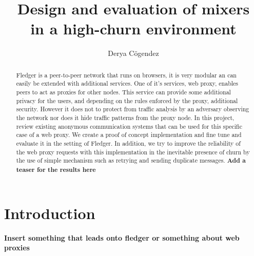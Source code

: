 \documentclass[a4paper,11pt,oneside]{report}
\title{Design and evaluation of mixers\\in a high-churn environment}
\author{Derya Cögendez}
\begin{document}
\maketitle
\makeacks

\begin{abstract}
Fledger is a peer-to-peer network that runs on browsers, it is very modular an can easily be extended with additional services. One of it's services, web proxy, enables peers to act as proxies for other nodes. This service can provide some additional privacy for the users, and depending on the rules enforced by the proxy, additional security. However it does not to protect from traffic analysis by an adversary observing the network nor does it hide traffic patterns from the proxy node. In this project, review existing anonymous communication systems that can be used for this specific case of a web proxy. We create a proof of concept implementation and fine tune and evaluate it in the setting of Fledger. In addition, we try to improve the reliability of the web proxy requests with this implementation in the inevitable presence of churn by the use of simple mechanism such as retrying and sending duplicate messages.
\textbf{Add a teaser for the results here}
\end{abstract}

\maketoc

\chapter{Introduction}

\textbf{Insert something that leads onto fledger or something about web proxies}
\end{document}
